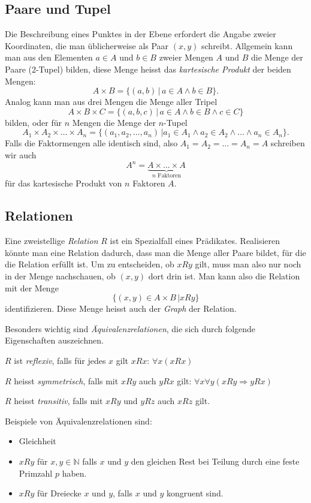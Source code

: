 \subsection{Paare und Tupel}
%
%
%
Die Beschreibung eines Punktes in der Ebene erfordert die Angabe zweier
Koordinaten, die man üblicherweise als Paar $(x,y)$ schreibt. Allgemein
kann man aus den Elementen $a\in A$ und $b\in B$ zweier Mengen $A$ und $B$
die Menge der Paare (2-Tupel) bilden, diese Menge heisst das
{\em kartesische Produkt} der beiden Mengen:
\[
A\times B = \{(a,b)\,|\,a\in A\wedge b\in B\}.
\]
%
Analog kann man aus drei Mengen die Menge aller Tripel
\[
A\times B\times C=\{(a,b,c)\,|\,a\in A\wedge b\in B\wedge c\in C\}
\]
bilden, oder für $n$ Mengen die Menge der $n$-Tupel
\[
A_1\times A_2\times\dots\times A_n
=\{(a_1,a_2,\dots,a_n)\,|a_1\in A_1\wedge a_2\in A_2\wedge\dots\wedge a_n\in A_n\}.
\]
Falls die Faktormengen alle identisch sind, also $A_1=A_2=\dots=A_n=A$
schreiben wir auch
\[
A^n= \underbrace{A\times \dots \times A}_{\text{$n$ Faktoren}}
\]
für das kartesische Produkt von $n$ Faktoren $A$.

\subsection{Relationen}
%
Eine zweistellige {\em Relation} $R$ ist ein Spezialfall eines Prädikates.
Realisieren könnte man eine Relation dadurch, dass man die Menge
aller Paare bildet, für die die Relation erfüllt ist. Um zu entscheiden,
ob $xRy$ gilt, muss man also nur noch in der Menge nachschauen,
ob $(x,y)$ dort drin ist. Man kann also die Relation mit der
Menge
\[
\{(x,y)\in A\times B\,| xRy\}
\]
identifizieren.
%
Diese Menge heisst auch der {\em Graph} der Relation.

Besonders wichtig sind {\em Äquivalenzrelationen}, die sich durch folgende
Eigenschaften auszeichnen.
\begin{compactenum}
\item $R$ ist {\em reflexiv}, falls für jedes $x$ gilt $xRx$: $\forall x(xRx)$
\item $R$ heisst {\em symmetrisch}, falls mit $xRy$ auch $yRx$ gilt: $\forall x\forall y(xRy\Rightarrow yRx)$
\item $R$ heisst {\em transitiv}, falls mit $xRy$ und $yRz$ auch $xRz$ gilt.
\end{compactenum}
Beispiele von Äquivalenzrelationen sind:
\begin{itemize}
\item Gleichheit
\item $xRy$ für $x,y\in\mathbb N$ falls $x$ und $y$ den gleichen
Rest bei Teilung durch eine feste Primzahl $p$ haben.
\item $xRy$ für Dreiecke $x$ und $y$, falls $x$ und $y$ kongruent sind.
\end{itemize}

